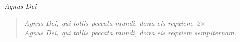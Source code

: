 \begin{center}
\itshape{Agnus Dei}
\end{center}

\small
\begin{verse}
\itshape{
Agnus Dei, qui tollis peccata mundi, dona eis requiem. 2$\times$\\
Agnus Dei, qui tollis peccata mundi, dona eis requiem sempiternam.}
\end{verse}
\normalsize